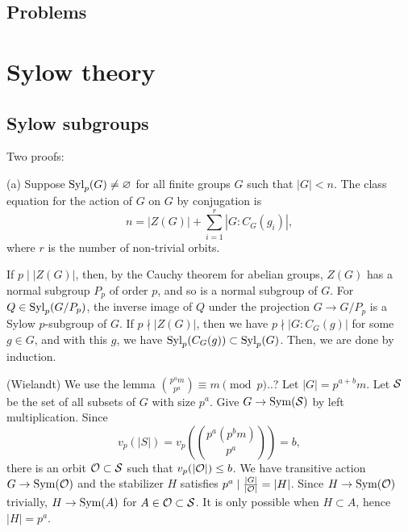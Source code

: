 \documentclass{../../large}
\begin{document}
\section*{Problems}







\chapter{Sylow theory}

\section{Sylow subgroups}

\begin{prb}
Two proofs:
\end{prb}
\begin{pf}
(a)
Suppose $\operatorname{Syl}_p(G)\ne\varnothing$ for all finite groups $G$ such that $|G|<n$.
The class equation for the action of $G$ on $G$ by conjugation is
\[n=|Z(G)|+\sum_{i=1}^r|G:C_G(g_i)|,\]
where $r$ is the number of non-trivial orbits.

If $p\mid|Z(G)|$, then, by the Cauchy theorem for abelian groups, $Z(G)$ has a normal subgroup $P_p$ of order $p$, and so is a normal subgroup of $G$.
For $Q\in\operatorname{Syl}_p(G/P_p)$, the inverse image of $Q$ under the projection $G\to G/P_p$ is a Sylow $p$-subgroup of $G$.
If $p\nmid|Z(G)|$, then we have $p\nmid|G:C_G(g)|$ for some $g\in G$, and with this $g$, we have $\operatorname{Syl}_p(C_G(g))\subset\operatorname{Syl}_p(G)$.
Then, we are done by induction.

(Wielandt)
We use the lemma $\binom{p^am}{p^a}\equiv m\pmod p$..?
Let $|G|=p^{a+b}m$.
Let $\mathcal{S}$ be the set of all subsets of $G$ with size $p^a$.
Give $G\to\operatorname{Sym}(\mathcal{S})$ by left multiplication.
Since
\[v_p(|S|)=v_p(\binom{p^a(p^bm)}{p^a})=b,\]
there is an orbit $\mathcal{O}\subset\mathcal{S}$ such that $v_p(|\mathcal{O}|)\le b$.
We have transitive action $G\to\operatorname{Sym}(\mathcal{O})$ and the stabilizer $H$ satisfies $p^a\mid\frac{|G|}{|\mathcal{O}|}=|H|$.
Since $H\to\operatorname{Sym}(\mathcal{O})$ trivially, $H\to\operatorname{Sym}(A)$ for $A\in\mathcal{O}\subset\mathcal{S}$.
It is only possible when $H\subset A$, hence $|H|=p^a$.
\end{pf}
\end{document}
